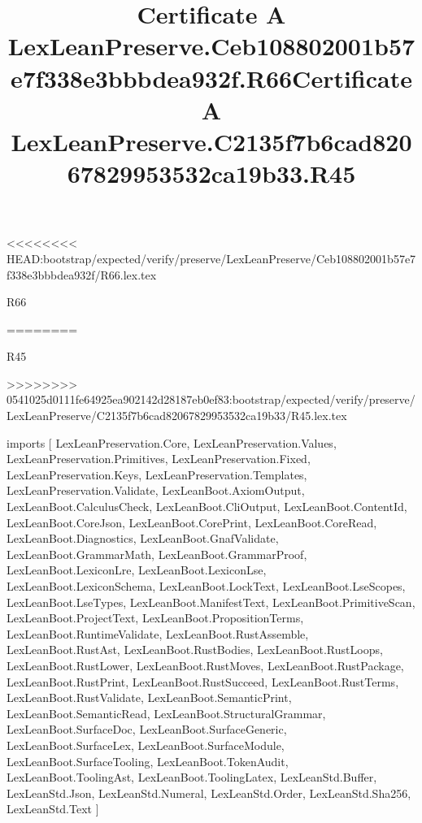 <<<<<<<< HEAD:bootstrap/expected/verify/preserve/LexLeanPreserve/Ceb108802001b57e7f338e3bbbdea932f/R66.lex.tex
\begin{lexlean}{R66}
\title{Certificate A LexLeanPreserve.Ceb108802001b57e7f338e3bbbdea932f.R66}
========
\begin{lexlean}{R45}
\title{Certificate A LexLeanPreserve.C2135f7b6cad82067829953532ca19b33.R45}
>>>>>>>> 0541025d0111fe64925ea902142d28187eb0ef83:bootstrap/expected/verify/preserve/LexLeanPreserve/C2135f7b6cad82067829953532ca19b33/R45.lex.tex
\begin{coremodule}
imports [
  LexLeanPreservation.Core,
  LexLeanPreservation.Values,
  LexLeanPreservation.Primitives,
  LexLeanPreservation.Fixed,
  LexLeanPreservation.Keys,
  LexLeanPreservation.Templates,
  LexLeanPreservation.Validate,
  LexLeanBoot.AxiomOutput,
  LexLeanBoot.CalculusCheck,
  LexLeanBoot.CliOutput,
  LexLeanBoot.ContentId,
  LexLeanBoot.CoreJson,
  LexLeanBoot.CorePrint,
  LexLeanBoot.CoreRead,
  LexLeanBoot.Diagnostics,
  LexLeanBoot.GnafValidate,
  LexLeanBoot.GrammarMath,
  LexLeanBoot.GrammarProof,
  LexLeanBoot.LexiconLre,
  LexLeanBoot.LexiconLse,
  LexLeanBoot.LexiconSchema,
  LexLeanBoot.LockText,
  LexLeanBoot.LseScopes,
  LexLeanBoot.LseTypes,
  LexLeanBoot.ManifestText,
  LexLeanBoot.PrimitiveScan,
  LexLeanBoot.ProjectText,
  LexLeanBoot.PropositionTerms,
  LexLeanBoot.RuntimeValidate,
  LexLeanBoot.RustAssemble,
  LexLeanBoot.RustAst,
  LexLeanBoot.RustBodies,
  LexLeanBoot.RustLoops,
  LexLeanBoot.RustLower,
  LexLeanBoot.RustMoves,
  LexLeanBoot.RustPackage,
  LexLeanBoot.RustPrint,
  LexLeanBoot.RustSucceed,
  LexLeanBoot.RustTerms,
  LexLeanBoot.RustValidate,
  LexLeanBoot.SemanticPrint,
  LexLeanBoot.SemanticRead,
  LexLeanBoot.StructuralGrammar,
  LexLeanBoot.SurfaceDoc,
  LexLeanBoot.SurfaceGeneric,
  LexLeanBoot.SurfaceLex,
  LexLeanBoot.SurfaceModule,
  LexLeanBoot.SurfaceTooling,
  LexLeanBoot.TokenAudit,
  LexLeanBoot.ToolingAst,
  LexLeanBoot.ToolingLatex,
  LexLeanStd.Buffer,
  LexLeanStd.Json,
  LexLeanStd.Numeral,
  LexLeanStd.Order,
  LexLeanStd.Sha256,
  LexLeanStd.Text
]


\end{coremodule}
\end{lexlean}
\end{lexlean}
